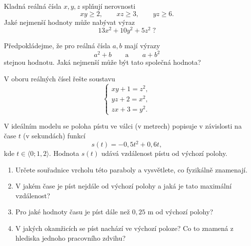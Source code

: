 \documentclass[12pt,a4paper]{article}
\begin{document}
\begin{exercise}
Kladná reálná čísla \(x, y, z\) splňují nerovnosti
\[
xy \ge 2,\qquad xz \ge 3,\qquad yz \ge 6.
\]
Jaké nejmenší hodnoty může nabývat výraz
\[
13x^2 + 10y^2 + 5z^2 \; ?
\]
\end{exercise}

\begin{exercise}
Předpokládejme, že pro reálná čísla \(a, b\) mají výrazy
\[
a^2 + b \qquad \text{a} \qquad a + b^2
\]
stejnou hodnotu.
Jaká nejmenší může být tato společná hodnota?
\end{exercise}

\begin{exercise}
V oboru reálných čísel řešte soustavu
\[
\begin{cases}
xy + 1 = z^2,\\
yz + 2 = x^2,\\
zx + 3 = y^2.
\end{cases}
\]
\end{exercise}


\begin{exercise}
V ideálním modelu se poloha pístu ve válci (v metrech) popisuje v závislosti na čase \(t\) (v sekundách) funkcí
\[
s(t) = -0{,}5t^2 + 0{,}6t,
\]
kde \(t \in \langle 0; 1{,}2 \rangle\). Hodnota \(s(t)\) udává vzdálenost pístu od výchozí polohy.

\begin{enumerate}[label=\alph*)]
  \item Určete souřadnice vrcholu této paraboly a vysvětlete, co fyzikálně znamenají.
  \item V jakém čase je píst nejdále od výchozí polohy a jaká je tato maximální vzdálenost?
  \item Pro jaké hodnoty času je píst dále než \(0{,}25\) m od výchozí polohy?
  \item V jakých okamžicích se píst nachází ve výchozí poloze? Co to znamená z hlediska jednoho pracovního zdvihu?
\end{enumerate}

\end{exercise}
\end{document}
